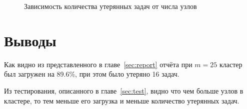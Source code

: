 \documentclass[12pt,a4paper,oneside]{extarticle}
\begin{document}
        \begin{figure}[h!]        
        \centering
        \caption{Зависимость количества утерянных задач от числа узлов}
        \label{pic:test2}
        \end{figure}

\section{Выводы}
    Как видно из представленного в главе~\ref{sec:report} отчёта при $m=25$ кластер был загружен на 89.6\%, при этом было утеряно 16 задач.

    Из тестирования, описанного в главе~\ref{sec:test}, видно что чем больше узлов в кластере, то тем меньше его загрузка и меньше количество утерянных задач.
\end{document}
